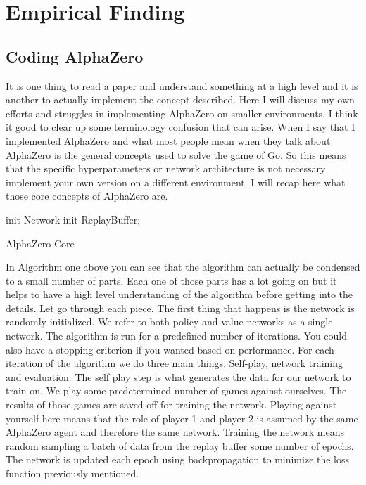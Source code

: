\section{Empirical Finding}

\subsection{Coding AlphaZero}

It is one thing to read a paper and understand something at a high level and it is another to actually implement the concept described. Here I will discuss my own efforts and struggles in implementing AlphaZero on smaller environments. I think it good to clear up some terminology confusion that can arise. When I say that I implemented AlphaZero and what most people mean when they talk about AlphaZero is the general concepts used to solve the game of Go. So this means that the specific hyperparameters or network architecture is not necessary implement your own version on a different environment. I will recap here what those core concepts of AlphaZero are. 

\begin{algorithm}[H]
\SetAlgoLined
 init Network\;
 init ReplayBuffer;
 
 \caption{AlphaZero Core}
  
\end{algorithm}

In Algorithm one above you can see that the algorithm can actually be condensed to a small number of parts. Each one of those parts has a lot going on but it helps to have a high level understanding of the algorithm before getting into the details. Let go through each piece. The first thing that happens is the network is randomly initialized. We refer to both policy and value networks as a single network. The algorithm is run for a predefined number of iterations. You could also have a stopping criterion if you wanted based on performance. For each iteration of the algorithm we do three main things. Self-play, network training and evaluation. The self play step is what generates the data for our network to train on. We play some predetermined number of games against ourselves. The results of those games are saved off for training the network. Playing against yourself here means that the role of player 1 and player 2 is assumed by the same AlphaZero agent and therefore the same network. Training the network means random sampling a batch of data from the replay buffer some number of epochs. The network is updated each epoch using backpropagation to minimize the loss function previously mentioned.  

